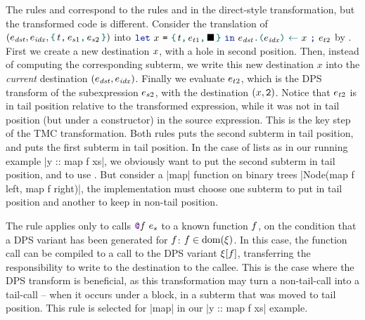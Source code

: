 The rules  and 
correspond to the rules  and  in the direct-style transformation, but the transformed code is different. Consider the translation of $
\left(
  \datalangExpr_\mathit{dst},
  \datalangExpr_\mathit{idx},
  \datalangBlock{\datalangTag}{\datalangExpr_{s1}}{\datalangExpr_{s2}}
\right)
$ into $
\datalangLet{\datalangVar}{\datalangBlock{\datalangTag}{\datalangExpr_{t1}}{\datalangHole}}{
  \datalangSeq{\datalangStore{\datalangExpr_\mathit{dst}}{\datalangExpr_\mathit{idx}}{\datalangVar}}{\datalangExpr_{t2}}}
$ by . First we create a new destination $\datalangVar$, with a hole in second position. Then, instead of computing the corresponding subterm, we write this new destination $x$ into the \emph{current} destination $({\datalangExpr_\mathit{dst}}, {\datalangExpr_\mathit{idx}})$. Finally we evaluate $\datalangExpr_{t2}$, which is the DPS transform of the subexpression $\datalangExpr_{s2}$, with the destination $(\datalangVar, \datalangTwo)$. Notice that $\datalangExpr_{t2}$ is in tail position relative to the transformed expression, while it was not in tail position (but under a constructor) in the source expression. This is the key step of the TMC transformation. Both rules  puts the second subterm in tail position, and  puts the first subterm in tail position. In the case of lists as in our running example \ocaml|y :: map f xs|, we obviously want to put the second subterm in tail position, and to use . But consider a \ocaml|map| function on binary trees \ocaml|Node(map f left, map f right)|, the implementation must choose one subterm to put in tail position and another to keep in non-tail position.

The rule  applies only to calls $\datalangCall {\datalangFnptr \datalangFn} {\datalangExpr_s}$ to a known function $\datalangFn$, on the condition that a DPS variant has been generated for $\datalangFn$: $\datalangFn \in \dom{\datalangRenaming}$. In this case, the function call can be compiled to a call to the DPS variant $\datalangRenaming [\datalangFn]$, transferring the responsibility to write to the destination to the callee. This is the case where the DPS transform is beneficial, as this transformation may turn a non-tail-call into a tail-call -- when it occurs under a block, in a subterm that was moved to tail position. This rule is selected for \ocaml|map| in our \ocaml|y :: map f xs| example.

